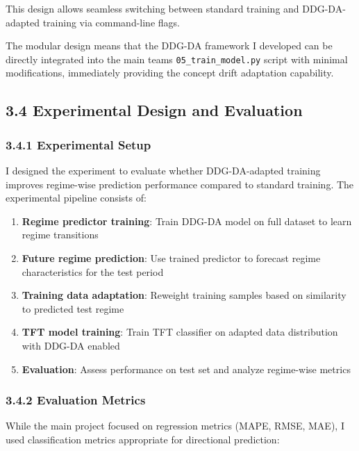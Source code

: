\documentclass[
]{article}
\begin{document}
This design allows seamless switching between standard training and
DDG-DA-adapted training via command-line flags.

The modular design means that the DDG-DA framework I developed can be
directly integrated into the main team\textquotesingle s
\texttt{05\_train\_model.py} script with minimal modifications,
immediately providing the concept drift adaptation capability.

\subsection{3.4 Experimental Design and
Evaluation}\label{34-experimental-design-and-evaluation}

\subsubsection{3.4.1 Experimental Setup}\label{341-experimental-setup}

I designed the experiment to evaluate whether DDG-DA-adapted training
improves regime-wise prediction performance compared to standard
training. The experimental pipeline consists of:

\begin{enumerate}
\def\labelenumi{\arabic{enumi}.}
\item
  \textbf{Regime predictor training}: Train DDG-DA model on full dataset
  to learn regime transitions
\item
  \textbf{Future regime prediction}: Use trained predictor to forecast
  regime characteristics for the test period
\item
  \textbf{Training data adaptation}: Reweight training samples based on
  similarity to predicted test regime
\item
  \textbf{TFT model training}: Train TFT classifier on adapted data
  distribution with DDG-DA enabled
\item
  \textbf{Evaluation}: Assess performance on test set and analyze
  regime-wise metrics
\end{enumerate}

\subsubsection{3.4.2 Evaluation Metrics}\label{342-evaluation-metrics}

While the main project focused on regression metrics (MAPE, RMSE, MAE),
I used classification metrics appropriate for directional prediction:
\end{document}
